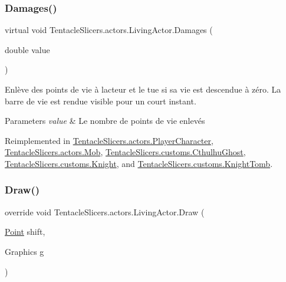 \subsubsection{\texorpdfstring{Damages()}{Damages()}}
{\footnotesize\ttfamily virtual void Tentacle\+Slicers.\+actors.\+Living\+Actor.\+Damages (\begin{DoxyParamCaption}\item[{double}]{value }\end{DoxyParamCaption})\hspace{0.3cm}{\ttfamily [virtual]}}



Enlève des points de vie à l\textquotesingle{}acteur et le tue si sa vie est descendue à zéro. La barre de vie est rendue visible pour un court instant. 


\begin{DoxyParams}{Parameters}
{\em value} & Le nombre de points de vie enlevés \\
\hline
\end{DoxyParams}


Reimplemented in \hyperlink{class_tentacle_slicers_1_1actors_1_1_player_character_a40d9846096c2aaddb7112631310b240b}{Tentacle\+Slicers.\+actors.\+Player\+Character}, \hyperlink{class_tentacle_slicers_1_1actors_1_1_mob_ac596097268c10f823e40533c869ced33}{Tentacle\+Slicers.\+actors.\+Mob}, \hyperlink{class_tentacle_slicers_1_1customs_1_1_cthulhu_ghost_aeeb398970bf8433917fe035f5ec47f66}{Tentacle\+Slicers.\+customs.\+Cthulhu\+Ghost}, \hyperlink{class_tentacle_slicers_1_1customs_1_1_knight_aa910b96f987e5aba0fb93b2aeabe6261}{Tentacle\+Slicers.\+customs.\+Knight}, and \hyperlink{class_tentacle_slicers_1_1customs_1_1_knight_tomb_a5a34249a8265891f3c3eb6d469f11b93}{Tentacle\+Slicers.\+customs.\+Knight\+Tomb}.

\mbox{\label{class_tentacle_slicers_1_1actors_1_1_living_actor_a9b8adc982e25895a4509c870f784b5f1}} 
\subsubsection{\texorpdfstring{Draw()}{Draw()}}
{\footnotesize\ttfamily override void Tentacle\+Slicers.\+actors.\+Living\+Actor.\+Draw (\begin{DoxyParamCaption}\item[{\hyperlink{class_tentacle_slicers_1_1general_1_1_point}{Point}}]{shift,  }\item[{Graphics}]{g }\end{DoxyParamCaption})\hspace{0.3cm}{\ttfamily [virtual]}}



